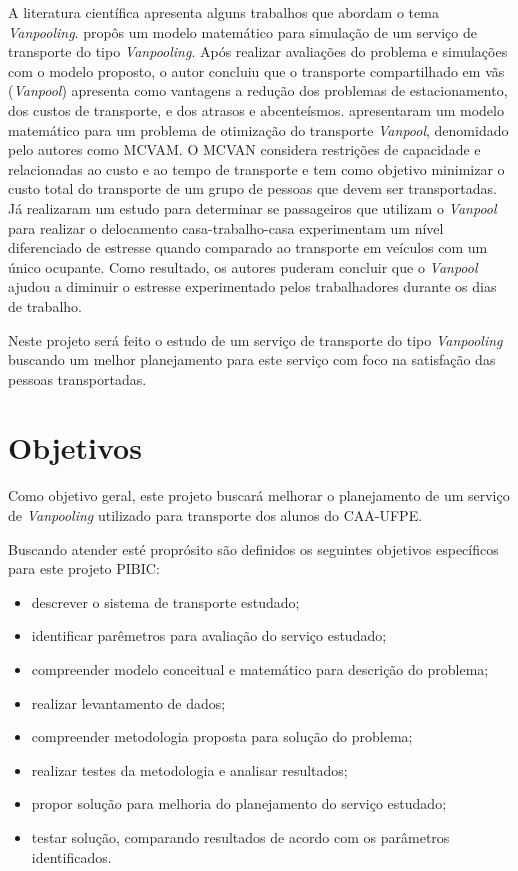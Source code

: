 \documentclass[11pt,a4paper]{article}
\begin{document}
A literatura científica apresenta alguns trabalhos que abordam o tema \emph{Vanpooling}. \cite{Nassar1986} propôs um modelo matemático para simulação de um serviço de transporte do tipo \emph{Vanpooling}. Após realizar avaliações do problema e simulações com o modelo proposto, o autor concluiu que o transporte compartilhado em vãs (\emph{Vanpool}) apresenta como vantagens a redução dos problemas de estacionamento, dos custos de transporte, e dos atrasos e abcenteísmos. \cite{KaanOlinick2013} apresentaram um modelo matemático para um problema de otimização do transporte \emph{Vanpool}, denomidado pelo autores como MCVAM. O MCVAN considera restrições de capacidade e relacionadas ao custo e ao tempo de transporte e tem como objetivo minimizar o custo total do transporte de um grupo de pessoas que devem ser transportadas.  Já \cite{DitmoreDeming2018} realizaram um estudo para determinar se passageiros que utilizam o \emph{Vanpool} para realizar o delocamento casa-trabalho-casa experimentam um nível diferenciado de estresse quando comparado ao transporte em veículos com um único ocupante. Como resultado, os autores puderam concluir que o \emph{Vanpool} ajudou a diminuir o estresse experimentado pelos trabalhadores durante os dias de trabalho.

Neste projeto será feito o estudo de um serviço de transporte do tipo \emph{Vanpooling} buscando um melhor planejamento para este serviço com foco na satisfação das pessoas transportadas.

\section{Objetivos}

Como objetivo geral, este projeto buscará melhorar o planejamento de um serviço de \emph{Vanpooling} utilizado para transporte dos alunos do CAA-UFPE.

Buscando atender esté proprósito são definidos os seguintes objetivos específicos para este projeto PIBIC:

\begin{itemize}
\item descrever o sistema de transporte estudado;
\item identificar parêmetros para avaliação do serviço estudado;
\item compreender modelo conceitual e matemático para descrição do problema;
\item realizar levantamento de dados;
\item compreender metodologia proposta para solução do problema;
\item realizar testes da metodologia e analisar resultados;
\item propor solução para melhoria do planejamento do serviço estudado;
\item testar solução, comparando resultados de acordo com os parâmetros identificados.
\end{itemize}
\end{document}
